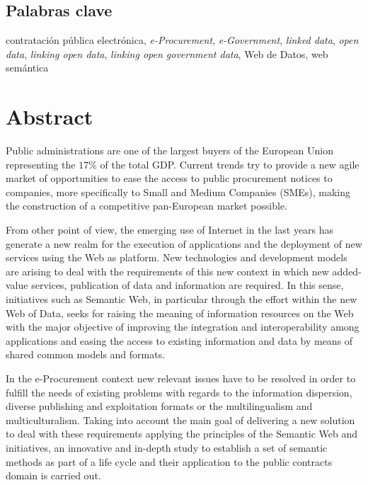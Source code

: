\section*{Palabras clave}

contratación pública electrónica, \textit{e-Procurement}, \textit{e-Government}, \textit{linked data}, \textit{open data}, 
\textit{linking open data}, \textit{linking open government data}, Web de Datos, web semántica

\chapter*{Abstract}
Public administrations are one of the largest buyers of the European Union representing the 
 $17$\% of the total GDP. Current trends try to provide a new agile market of opportunities to 
ease the access to public procurement notices to companies, more specifically to Small 
and Medium Companies (SMEs), making the construction of a competitive pan-European market possible.

From other point of view, the emerging use of Internet in the last years has generate a new realm for the 
execution of applications and the deployment of new services using the Web as platform. New technologies 
and development models are arising to deal with the requirements of this new context in which new added-value 
services, publication of data and information are required. In this sense, initiatives such as Semantic 
Web, in particular through the \linkeddata effort within the new Web of Data, seeks for raising the meaning 
of information resources on the Web with the major objective of improving the integration and interoperability 
among applications and easing the access to existing information and data by means of shared common models and formats.

In the e-Procurement context new relevant issues have to be resolved in order to fulfill the needs 
of existing problems with regards to the information dispersion, diverse publishing and exploitation formats or 
the multilingualism and multiculturalism. Taking into account the main goal of delivering a new solution 
to deal with these requirements applying the principles of the Semantic Web and \linkeddata initiatives, an innovative and 
in-depth study to establish a set of semantic methods as part of a \linkeddata life cycle and 
their application to the public contracts domain is carried out.

